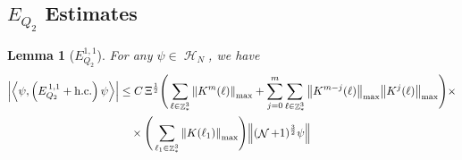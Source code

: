 \documentclass[sn-mathphys, Numbered ,a4paper]{sn-jnl}%
\DeclareMathOperator{\Z}{\mathbb{Z}}
\DeclareMathOperator{\HH}{\mathcal{H}}
\DeclareMathOperator{\NN}{\mathcal{N}}
\newcommand{\half}{\frac{1}{2}}
\newcommand{\eva}[1]{\left\langle #1 \right\rangle}
\theoremstyle{plain}
\newtheorem{lemma}[theorem]{Lemma}
\theoremstyle{definition}
\theoremstyle{remark}
\theoremstyle{plain}
\theoremstyle{definition}
\theoremstyle{remark}
\begin{document}
\subsection{$E_{Q_2}$ Estimates}
\begin{lemma}[$E_{Q_2}^{1,1}$]
    For any $\psi \in \HH_N$, we have
    \begin{align}
    	\abs{\eva{\psi,\left(E^{\,1,1}_{Q_2}+\mathrm{h.c.}\right) \psi }}
    	&\leq  C\, \Xi^{\half} \Bigg(\sum\limits_{\ell \in \Z^3_*} \norm{K^m(\ell)}_{\mathrm{max}} + \sum\limits_{j=0}^m \sum\limits_{\ell \in \Z^3_*}\norm{K^{m-j}(\ell)}_{\mathrm{max}}\norm{K^{j}(\ell)}_{\mathrm{max}}\Bigg)\times\nonumber\\&\quad\times \Bigg( \sum\limits_{\ell_1 \in \Z^3_*}\norm{K(\ell_1)}_{\mathrm{max}} \Bigg)  \norm { (\NN+1)^{\frac{3}{2}} \psi }  \label{eq:estEQ211}
    \end{align}
\end{lemma}
\end{document}
